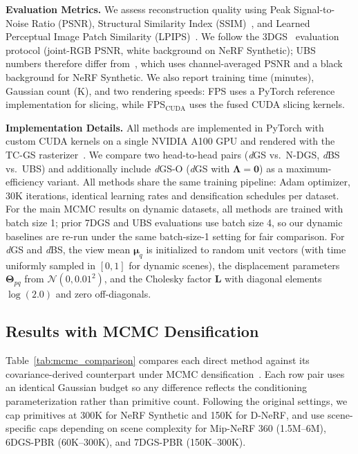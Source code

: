 \documentclass{article}
\newcommand{\dgs}{\textit{d}GS\xspace}
\newcommand{\dbs}{\textit{d}BS\xspace}
\newcommand{\dgso}{\textit{d}GS-O\xspace}
\theoremstyle{plain}
\theoremstyle{definition}
\theoremstyle{remark}
\begin{document}
\textbf{Evaluation Metrics.}
We assess reconstruction quality using Peak Signal-to-Noise Ratio (PSNR), Structural Similarity Index (SSIM)~\citep{wang2004image}, and Learned Perceptual Image Patch Similarity (LPIPS)~\citep{zhang2018perceptual}. We follow the 3DGS~\citep{3dgs} evaluation protocol (joint-RGB PSNR, white background on NeRF Synthetic); UBS numbers therefore differ from~\citep{liu2025universal}, which uses channel-averaged PSNR and a black background for NeRF Synthetic. We also report training time (minutes), Gaussian count (K), and two rendering speeds: FPS uses a PyTorch reference implementation for slicing, while FPS$_{\text{CUDA}}$ uses the fused CUDA slicing kernels.

\textbf{Implementation Details.}
All methods are implemented in PyTorch with custom CUDA kernels on a single NVIDIA A100 GPU and rendered with the TC-GS rasterizer~\citep{liao2025tc}. We compare two head-to-head pairs (\dgs{} vs.\ N-DGS, \dbs{} vs.\ UBS) and additionally include \dgso{} (\dgs{} with $\boldsymbol{\Lambda}{=}\mathbf{0}$) as a maximum-efficiency variant. All methods share the same training pipeline: Adam optimizer, 30K iterations, identical learning rates and densification schedules per dataset. For the main MCMC results on dynamic datasets, all methods are trained with batch size 1; prior 7DGS and UBS evaluations use batch size 4, so our dynamic baselines are re-run under the same batch-size-1 setting for fair comparison. For \dgs{} and \dbs{}, the view mean $\boldsymbol{\mu}_q$ is initialized to random unit vectors (with time uniformly sampled in $[0,1]$ for dynamic scenes), the displacement parameters $\boldsymbol{\Theta}_{pq}$ from $\mathcal{N}(0,0.01^2)$, and the Cholesky factor $\mathbf{L}$ with diagonal elements $\log(2.0)$ and zero off-diagonals.

\subsection{Results with MCMC Densification}

Table~\ref{tab:mcmc_comparison} compares each direct method against its covariance-derived counterpart under MCMC densification~\citep{kheradmand20243dgaussiansplattingmarkov}. Each row pair uses an identical Gaussian budget so any difference reflects the conditioning parameterization rather than primitive count. Following the original settings, we cap primitives at 300K for NeRF Synthetic and 150K for D-NeRF, and use scene-specific caps depending on scene complexity for Mip-NeRF 360 (1.5M--6M), 6DGS-PBR (60K--300K), and 7DGS-PBR (150K--300K).
\end{document}
